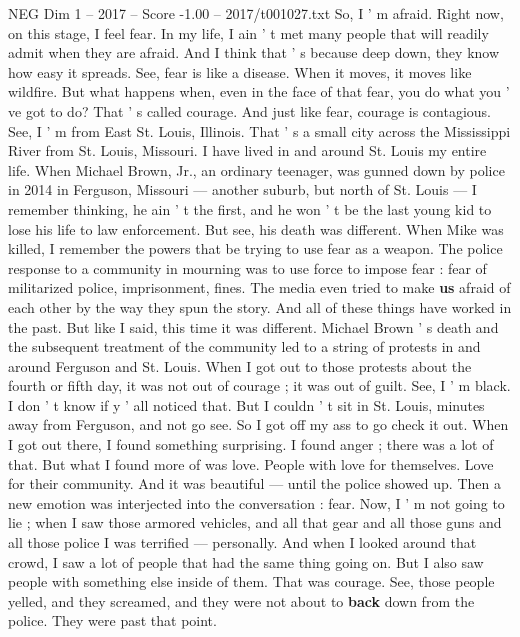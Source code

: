 \begin{textsample}{NEG Dim 1 – 2017 – Score -1.00 – 2017/t001027.txt}  \label{ex:f1_neg_026}
So, I ' m afraid.
Right now, on this stage, I feel fear.
In my life, I ain ' t met many people that will readily admit when they are afraid.
And I think that ' s because deep down, they know how easy it spreads.
See, fear is like a disease.
When it moves, it moves like wildfire.
But what happens when, even in the face of that fear, you do what you ' ve got to do?
That ' s called courage.
And just like fear, courage is contagious.
See, I ' m from East St.
Louis, Illinois.
That ' s a small city across the Mississippi River from St.
Louis, Missouri.
I have lived in and around St.
Louis my entire life.
When Michael Brown, Jr., an ordinary teenager, was gunned down by police in 2014 in Ferguson, Missouri — another suburb, but north of St.
Louis — I remember thinking, he ain ' t the first, and he won ' t be the last young kid to lose his life to law enforcement.
But see, his death was different.
When Mike was killed, I remember the powers that be trying to use fear as a weapon.
The police response to a community in mourning was to use force to impose fear : fear of militarized police, imprisonment, fines.
The media even tried to make \textbf{us} afraid of each other by the way they spun the story.
And all of these things have worked in the past.
But like I said, this time it was different.
Michael Brown ' s death and the subsequent treatment of the community led to a string of protests in and around Ferguson and St.
Louis.
When I got out to those protests about the fourth or fifth day, it was not out of courage ; it was out of guilt.
See, I ' m black.
I don ' t know if y ' all noticed that.
But I couldn ' t sit in St.
Louis, minutes away from Ferguson, and not go see.
So I got off my ass to go check it out.
When I got out there, I found something surprising.
I found anger ; there was a lot of that.
But what I found more of was love.
People with love for themselves.
Love for their community.
And it was beautiful — until the police showed up.
Then a new emotion was interjected into the conversation : fear.
Now, I ' m not going to lie ; when I saw those armored vehicles, and all that gear and all those guns and all those police I was terrified — personally.
And when I looked around that crowd, I saw a lot of people that had the same thing going on.
But I also saw people with something else inside of them.
That was courage.
See, those people yelled, and they screamed, and they were not about to \textbf{back} down from the police.
They were past that point.

\end{textsample}
